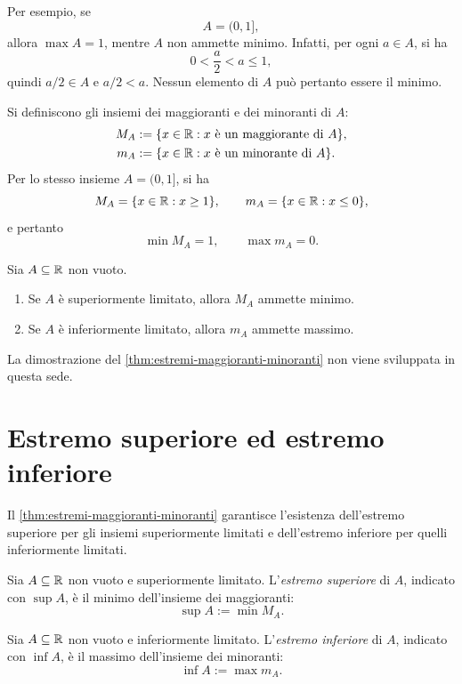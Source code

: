 Per esempio, se
\[
  A=(0,1],
\]
allora \(\max A=1\), mentre \(A\) non ammette minimo.
Infatti, per ogni \(a\in A\), si ha
\[
  0<\frac a2<a\le1,
\]
quindi \(a/2\in A\) e \(a/2<a\). Nessun elemento di
\(A\) può pertanto essere il minimo.

Si definiscono gli insiemi dei maggioranti e dei minoranti di \(A\):
\[
\begin{aligned}
  M_A&:=\{x\in\mathbb{R}:x\text{ è un maggiorante di }A\},\\
  m_A&:=\{x\in\mathbb{R}:x\text{ è un minorante di }A\}.
\end{aligned}
\]
Per lo stesso insieme \(A=(0,1]\), si ha
\[
  M_A=\{x\in\mathbb{R}:x\ge1\},
  \qquad
  m_A=\{x\in\mathbb{R}:x\le0\},
\]
e pertanto
\[
  \min M_A=1,
  \qquad
  \max m_A=0.
\]

\begin{theorem}
\label{thm:estremi-maggioranti-minoranti}
Sia \(A\subseteq\mathbb{R}\) non vuoto.
\begin{enumerate}
  \item Se \(A\) è superiormente limitato, allora \(M_A\) ammette minimo.
  \item Se \(A\) è inferiormente limitato, allora \(m_A\) ammette massimo.
\end{enumerate}
\end{theorem}

La dimostrazione del \cref{thm:estremi-maggioranti-minoranti}
non viene sviluppata in questa sede.

\clearpage

\section{Estremo superiore ed estremo inferiore}
\label{sec:lez04-estremi}

Il \cref{thm:estremi-maggioranti-minoranti} garantisce
l'esistenza dell'estremo superiore per gli insiemi superiormente
limitati e dell'estremo inferiore per quelli inferiormente limitati.

\begin{definition}
\label{def:estremo-superiore}
Sia \(A\subseteq\mathbb{R}\) non vuoto e superiormente limitato.
L'\emph{estremo superiore} di \(A\), indicato con \(\sup A\),
è il minimo dell'insieme dei maggioranti:
\[
  \sup A:=\min M_A.
\]
\end{definition}

\begin{definition}
\label{def:estremo-inferiore}
Sia \(A\subseteq\mathbb{R}\) non vuoto e inferiormente limitato.
L'\emph{estremo inferiore} di \(A\), indicato con \(\inf A\),
è il massimo dell'insieme dei minoranti:
\[
  \inf A:=\max m_A.
\]
\end{definition}

